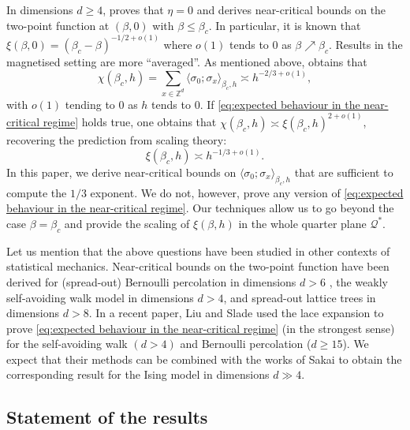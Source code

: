 \documentclass[11pt,a4paper]{article}
\numberwithin{equation}{section}
\theoremstyle{plain}
\theoremstyle{definition}
\begin{document}
 In dimensions $d\geq 4$, \cite{DuminilPanis2024newLB} proves that $\eta=0$ and derives near-critical bounds on the two-point function at $(\beta,0)$ with $\beta\leq \beta_c$. In particular, it is known that $\xi(\beta,0)=(\beta_c-\beta)^{-1/2+o(1)}$ where $o(1)$ tends to $0$ as $\beta\nearrow \beta_c$. Results in the magnetised setting are more ``averaged''. As mentioned above, \cite{AizenmanFernandezCriticalBehaviorMagnetization1986} obtains that
 \begin{equation}
 	\chi(\beta_c,h)=\sum_{x\in \mathbb Z^d}\langle \sigma_0;\sigma_x\rangle_{\beta_c,h}\asymp h^{-2/3+o(1)},
 \end{equation}
 with $o(1)$ tending to $0$ as $h$ tends to $0$.
 If \eqref{eq:expected behaviour in the near-critical regime} holds true, one obtains that $\chi(\beta_c,h)\asymp \xi(\beta_c,h)^{2+o(1)}$, recovering the prediction from scaling theory: 
 \begin{equation}
 \xi(\beta_c,h)\asymp h^{-1/3+o(1)}.
 \end{equation}
  In this paper, we derive near-critical bounds on $\langle\sigma_0;\sigma_x\rangle_{\beta_c,h}$ that are sufficient to compute the $1/3$ exponent. We do not, however, prove any version of \eqref{eq:expected behaviour in the near-critical regime}. Our techniques allow us to go beyond the case $\beta=\beta_c$ and provide the scaling of $\xi(\beta,h)$ in the whole quarter plane $\mathcal Q^*$.
 
Let us mention that the above questions have been studied in other contexts of statistical mechanics. Near-critical bounds on the two-point function have been derived for (spread-out) Bernoulli percolation in dimensions $d>6$ \cite{HutchcroftMichtaSladePercolationTorusPlateau2023,DumPan24Perco,duminil2026random,panis2026reversing}, the weakly self-avoiding walk model \cite{Liu2023Plateau,Slade2023Plateau,DumPan24WSAW} in dimensions $d>4$, and spread-out lattice trees \cite{liu2025near} in dimensions $d>8$. In a recent paper, Liu and Slade \cite{liu2026crossover} used the lace expansion to prove \eqref{eq:expected behaviour in the near-critical regime} (in the strongest sense) for the self-avoiding walk $(d>4)$ and Bernoulli percolation ($d\geq 15$). We expect that their methods can be combined with the works of Sakai \cite{Sakai2007LaceExpIsing,Sakai2022correctboundsIsing} to obtain the corresponding result for the Ising model in dimensions $d\gg 4$.

\subsection{Statement of the results}
\end{document}
